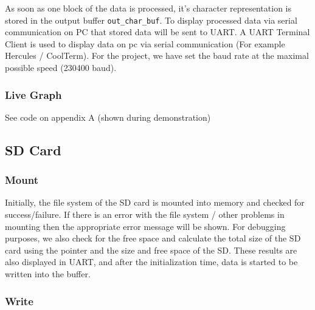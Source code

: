 \documentclass[11pt]{article}
\begin{document}
As soon as one block of the data is processed, it's character representation is stored in the output buffer \texttt{out\_char\_buf}. To display processed data via serial communication on PC that stored data will be sent to UART. A UART Terminal Client is used to display data on pc via serial communication (For example Hercules / CoolTerm). For the project, we have set the baud rate at the maximal possible speed (230400 baud).

\subsubsection*{Live Graph}
\label{sec:orgfbd36a5}
See code on appendix A (shown during demonstration)

\subsection{SD Card}
\label{sec:orgb35b613}

\subsubsection*{Mount}
\label{sec:org11b1563}

Initially, the file system of the SD card is mounted into memory and checked for success/failure. If there is an error with the file system / other problems in mounting then the appropriate error message will be shown. For debugging purposes, we also check for the free space and calculate the total size of the SD card using the pointer and the size and free space of the SD. These results are also displayed in UART, and after the initialization time, data is started to be written into the buffer.
\subsubsection*{Write}
\label{sec:org1aa6eb6}
\end{document}
